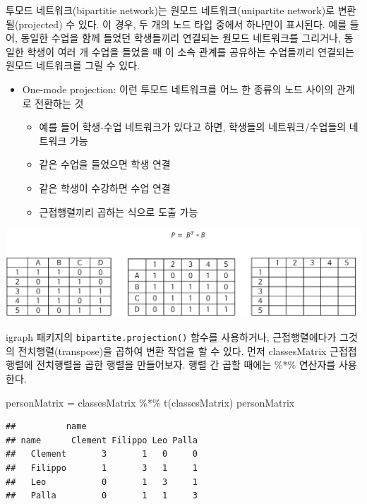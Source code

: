 \documentclass[
]{book}
\newenvironment{Shaded}{\begin{snugshade}}{\end{snugshade}}
\newcommand{\FunctionTok}[1]{\textcolor[rgb]{0.00,0.00,0.00}{#1}}
\newcommand{\NormalTok}[1]{#1}
\newcommand{\OtherTok}[1]{\textcolor[rgb]{0.56,0.35,0.01}{#1}}
\newcommand{\SpecialCharTok}[1]{\textcolor[rgb]{0.00,0.00,0.00}{#1}}
\begin{document}
투모드 네트워크(bipartitie network)는 원모드 네트워크(unipartite network)로 변환될(projected) 수 있다. 이 경우, 두 개의 노드 타입 중에서 하나만이 표시된다. 예를 들어, 동일한 수업을 함께 들었던 학생들끼리 연결되는 원모드 네트워크를 그리거나, 동일한 학생이 여러 개 수업을 들었을 때 이 소속 관계를 공유하는 수업들끼리 연결되는 원모드 네트워크를 그릴 수 있다.

\begin{itemize}
\item
  One-mode projection: 이런 투모드 네트워크를 어느 한 종류의 노드 사이의 관계로 전환하는 것

  \begin{itemize}
  \item
    예를 들어 학생-수업 네트워크가 있다고 하면, 학생들의 네트워크/수업들의 네트워크 가능
  \item
    같은 수업을 들었으면 학생 연결
  \item
    같은 학생이 수강하면 수업 연결
  \item
    근접행렬끼리 곱하는 식으로 도출 가능
  \end{itemize}
\end{itemize}

\begin{center}\includegraphics[width=0.8\linewidth]{images/projection} \end{center}

igraph 패키지의 \texttt{bipartite.projection()} 함수를 사용하거나, 근접행렬에다가 그것의 전치행렬(transpose)을 곱하여 변환 작업을 할 수 있다. 먼저 classesMatrix 근접접행렬에 전치행렬을 곱한 행렬을 만들어보자. 행렬 간 곱할 때에는 \%*\% 연산자를 사용한다.

\begin{Shaded}
\begin{Highlighting}[]
\NormalTok{personMatrix }\OtherTok{=}\NormalTok{ classesMatrix }\SpecialCharTok{\%*\%} \FunctionTok{t}\NormalTok{(classesMatrix) }
\NormalTok{personMatrix}
\end{Highlighting}
\end{Shaded}

\begin{verbatim}
##          name
## name      Clement Filippo Leo Palla
##   Clement       3       1   0     0
##   Filippo       1       3   1     1
##   Leo           0       1   3     1
##   Palla         0       1   1     3
\end{verbatim}
\end{document}
